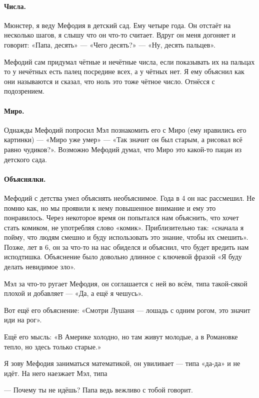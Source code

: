 \documentclass{book}
\begin{document}
\paragraph{Числа.} Мюнстер, я веду Мефодия в детский сад.
Ему четыре года.
Он отстаёт на несколько шагов, 
я слышу что он что-то считает.
Вдруг он меня догоняет и говорит:
«Папа, десять» --- «Чего десять?» --- «Ну, десять пальцев».

Мефодий сам придумал чётные и нечётные числа, если показывать их на пальцах то у нечётных есть палец посредине всех, а у чётных нет.
Я ему объяснил как они называются и сказал, что ноль это тоже чётное число.
Отнёсся с подозрением.

\paragraph{Миро.} Однажды Мефодий попросил Мэл познакомить его с Миро (ему нравились его картинки) --- «Миро уже умер» --- «Так значит он был старым, а рисовал всё равно чудиков?».
Возможно Мефодий думал, что Миро это какой-то пацан из детского сада.


\paragraph{Объяснялки.} Мефодий с детства умел объяснять необъяснимое. 
Года в 4 он нас рассмешил.
Не помню как, но мы проявили к нему повышенное внимание и ему это понравилось.
Через некоторое время он попытался нам объяснить, что хочет стать комиком, не употребляя слово «комик».
Приблизительно так: «сначала я пойму, что людям смешно и буду использовать это знание, чтобы их смешить».
Позже, лет в 6, он за что-то на нас обиделся и объяснил, что будет вредить нам исподтишка.
Объяснение было довольно длинное с ключевой фразой «Я буду делать невидимое зло».

Мэл за что-то ругает Мефодия, он соглашается с ней во всём, типа такой-сякой плохой и добавляет --- «Да, а ещё я чешусь».

Вот ещё его объяснение: «Смотри Лушаня --- лошадь с одним рогом, это значит иди на рог».

Ещё его мысль: «В Америке холодно, но там живут молодые, а в Романовке тепло, но здесь только старые.» 

Я зову Мефодия заниматься математикой, он увиливает --- типа «да-да» и не идёт.
На него наезжает Мэл, типа 

--- Почему ты не идёшь? Папа ведь вежливо с тобой говорит.
\end{document}
